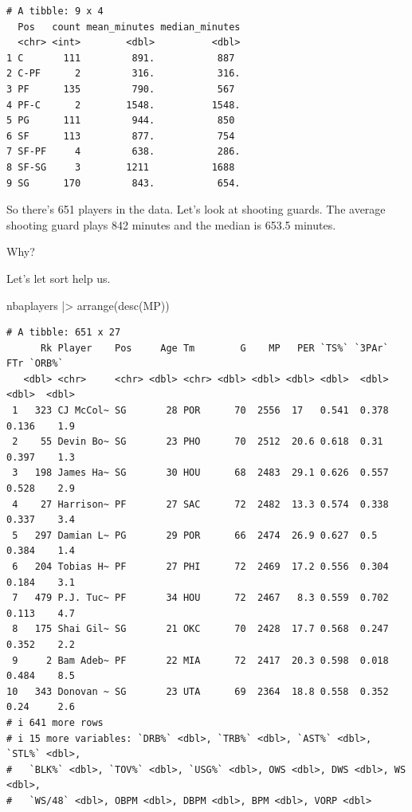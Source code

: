 \documentclass[
  letterpaper,
  DIV=11,
  numbers=noendperiod]{scrreprt}
\newenvironment{Shaded}{\begin{snugshade}}{\end{snugshade}}
\newcommand{\FunctionTok}[1]{\textcolor[rgb]{0.28,0.35,0.67}{#1}}
\newcommand{\NormalTok}[1]{\textcolor[rgb]{0.00,0.23,0.31}{#1}}
\newcommand{\SpecialCharTok}[1]{\textcolor[rgb]{0.37,0.37,0.37}{#1}}
\begin{document}
\begin{verbatim}
# A tibble: 9 x 4
  Pos   count mean_minutes median_minutes
  <chr> <int>        <dbl>          <dbl>
1 C       111         891.           887 
2 C-PF      2         316.           316.
3 PF      135         790.           567 
4 PF-C      2        1548.          1548.
5 PG      111         944.           850 
6 SF      113         877.           754 
7 SF-PF     4         638.           286.
8 SF-SG     3        1211           1688 
9 SG      170         843.           654.
\end{verbatim}

So there's 651 players in the data. Let's look at shooting guards. The
average shooting guard plays 842 minutes and the median is 653.5
minutes.

Why?

Let's let sort help us.

\begin{Shaded}
\begin{Highlighting}[]
\NormalTok{nbaplayers }\SpecialCharTok{|\textgreater{}} \FunctionTok{arrange}\NormalTok{(}\FunctionTok{desc}\NormalTok{(MP))}
\end{Highlighting}
\end{Shaded}

\begin{verbatim}
# A tibble: 651 x 27
      Rk Player    Pos     Age Tm        G    MP   PER `TS%` `3PAr`   FTr `ORB%`
   <dbl> <chr>     <chr> <dbl> <chr> <dbl> <dbl> <dbl> <dbl>  <dbl> <dbl>  <dbl>
 1   323 CJ McCol~ SG       28 POR      70  2556  17   0.541  0.378 0.136    1.9
 2    55 Devin Bo~ SG       23 PHO      70  2512  20.6 0.618  0.31  0.397    1.3
 3   198 James Ha~ SG       30 HOU      68  2483  29.1 0.626  0.557 0.528    2.9
 4    27 Harrison~ PF       27 SAC      72  2482  13.3 0.574  0.338 0.337    3.4
 5   297 Damian L~ PG       29 POR      66  2474  26.9 0.627  0.5   0.384    1.4
 6   204 Tobias H~ PF       27 PHI      72  2469  17.2 0.556  0.304 0.184    3.1
 7   479 P.J. Tuc~ PF       34 HOU      72  2467   8.3 0.559  0.702 0.113    4.7
 8   175 Shai Gil~ SG       21 OKC      70  2428  17.7 0.568  0.247 0.352    2.2
 9     2 Bam Adeb~ PF       22 MIA      72  2417  20.3 0.598  0.018 0.484    8.5
10   343 Donovan ~ SG       23 UTA      69  2364  18.8 0.558  0.352 0.24     2.6
# i 641 more rows
# i 15 more variables: `DRB%` <dbl>, `TRB%` <dbl>, `AST%` <dbl>, `STL%` <dbl>,
#   `BLK%` <dbl>, `TOV%` <dbl>, `USG%` <dbl>, OWS <dbl>, DWS <dbl>, WS <dbl>,
#   `WS/48` <dbl>, OBPM <dbl>, DBPM <dbl>, BPM <dbl>, VORP <dbl>
\end{verbatim}
\end{document}
